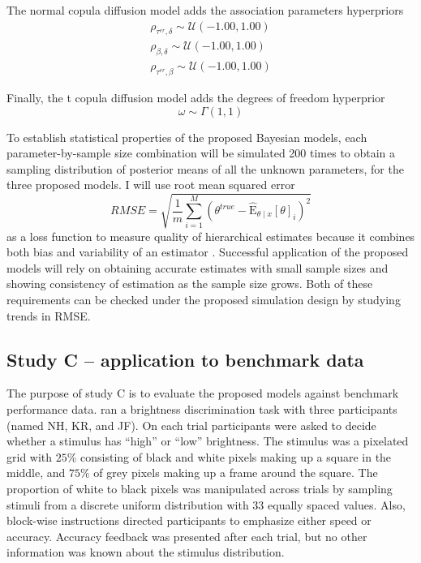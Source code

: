 \documentclass[12pt]{article}
\begin{document}
The normal copula diffusion model adds the association parameters hyperpriors
\begin{eqnarray}
\rho_{\tau^{er},\delta} \sim \mathcal{U}(-1.00, 1.00) \nonumber \\
\rho_{\beta,\delta} \sim \mathcal{U}(-1.00, 1.00) \nonumber \\
\rho_{\tau^{er},\beta} \sim \mathcal{U}(-1.00, 1.00)
\end{eqnarray}

Finally, the t copula diffusion model adds the degrees of freedom hyperprior
\begin{equation}
\omega \sim \Gamma(1, 1)
\end{equation}
 
	To establish statistical properties of the proposed Bayesian models, each parameter-by-sample size combination will be simulated 200 times to obtain a sampling distribution of posterior means of all the unknown parameters, for the three proposed models. I will use root mean squared error
\begin{equation}
RMSE = \sqrt{\frac{1}{m}\sum_{i=1}^M (\theta^{true} - \operatorname{\hat E}_{\theta \mid x}[\theta]_i)^2}
\end{equation}
as a loss function to measure quality of hierarchical estimates because it combines both bias and variability of an estimator \citep{CasBer2002,RatTue2002,RouLu2005}. Successful application of the proposed models will rely on obtaining accurate estimates with small sample sizes and showing consistency of estimation as the sample size grows. Both of these requirements can be checked under the proposed simulation design by studying trends in RMSE.

\subsection{Study C – application to benchmark data}
	The purpose of study C is to evaluate the proposed models against benchmark performance data. \citet{RatRou1998} ran a brightness discrimination task with three participants (named NH, KR, and JF). On each trial participants were asked to decide whether a stimulus has “high” or “low” brightness. The stimulus was a pixelated grid with $25\%$ consisting of black and white pixels making up a square in the middle, and $75\%$ of grey pixels making up a frame around the square. The proportion of white to black pixels was manipulated across trials by sampling stimuli from a discrete uniform distribution with 33 equally spaced values. Also, block-wise instructions directed participants to emphasize either speed or accuracy. Accuracy feedback was presented after each trial, but no other information was known about the stimulus distribution.
\end{document}
